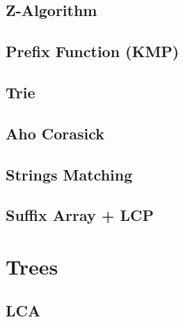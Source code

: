 \subsection{Z-Algorithm}
\raggedbottom
\hrulefill
\subsection{ Prefix Function (KMP)}
\raggedbottom
\hrulefill
\subsection{ Trie}
\raggedbottom
\hrulefill
\subsection{   Aho Corasick}
\raggedbottom
\hrulefill
\subsection{Strings Matching}
\raggedbottom
\hrulefill
\subsection{Suffix Array + LCP}
\raggedbottom
\hrulefill

\section{Trees}
\subsection{LCA}
\raggedbottom
\hrulefill


